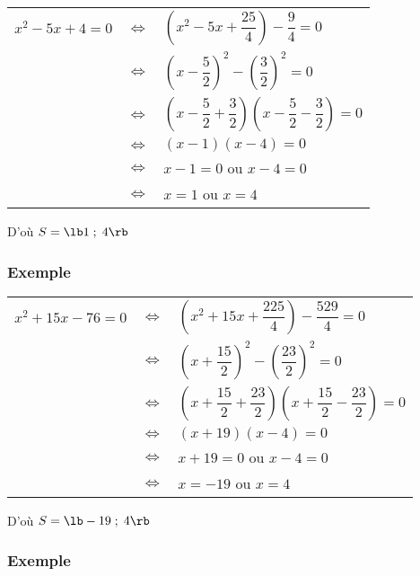 \begin{tabular}{lll}
$x^2 - 5x + 4 = 0$ & $\Longleftrightarrow$ & $\left(x^2 - 5x + \dfrac{25}{4} \right) - \dfrac{9}{4} = 0$ \\
& $\Longleftrightarrow$ & $\left(x - \dfrac{5}{2}\right)^2 - \left(\dfrac{3}{2}\right)^2 = 0$ \\
& $\Longleftrightarrow$ & $\left(x - \dfrac{5}{2} + \dfrac{3}{2}\right)\left(x - \dfrac{5}{2} - \dfrac{3}{2} \right) = 0$ \\
& $\Longleftrightarrow$ & $\left(x-1\right)\left(x-4\right) = 0$ \\
& $\Longleftrightarrow$ & $ x -1 = 0$ ou $x - 4 = 0$ \\
& $\Longleftrightarrow$ & $ x = 1 $ ou $ x = 4 $ \\
\end{tabular}

\vspace*{.3cm}

D'où $S = \lb 1 \; ; \; 4 \rb $ 

\subsubsection{Exemple }

\begin{tabular}{lll}
$x^2 + 15x - 76 = 0 $ & $\Longleftrightarrow$ & $\left(x^2 + 15x + \dfrac{225}{4}\right) - \dfrac{529}{4} = 0$ \\
& $\Longleftrightarrow$ & $\left(x + \dfrac{15}{2}\right)^2 -  \left(\dfrac{23}{2}\right)^2 = 0$ \\
& $\Longleftrightarrow$ & $\left(x + \dfrac{15}{2} + \dfrac{23}{2}\right)\left(x + \dfrac{15}{2} - \dfrac{23}{2}\right) = 0$ \\
& $\Longleftrightarrow$ & $\left(x + 19\right)\left(x - 4\right) = 0$ \\
& $\Longleftrightarrow$ & $x + 19 = 0 $ ou $x - 4 = 0$ \\
& $\Longleftrightarrow$ & $x = -19 $ ou $x = 4$ \\
\end{tabular}

D'où $S = \lb -19 \; ; \; 4 \rb $ 

\subsubsection{Exemple }

